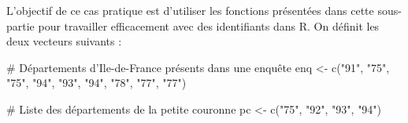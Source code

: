 \documentclass[12pt,twosided, notitlepage]{book}
\newenvironment{Shaded}{}{}
\newcommand{\KeywordTok}[1]{\textcolor[rgb]{0.00,0.00,1.00}{#1}}
\newcommand{\StringTok}[1]{\textcolor[rgb]{0.00,0.50,0.50}{#1}}
\newcommand{\CommentTok}[1]{\textcolor[rgb]{0.00,0.50,0.00}{#1}}
\newcommand{\NormalTok}[1]{#1}
\renewenvironment{Shaded}{\begin{snugshade}}{\end{snugshade}}
\begin{document}
L'objectif de ce cas pratique est d'utiliser les fonctions présentées
dans cette sous-partie pour travailler efficacement avec des
identifiants dans R. On définit les deux vecteurs suivants :

\begin{Shaded}
\begin{Highlighting}[]
\CommentTok{# Départements d'Ile-de-France présents dans une enquête}
\NormalTok{enq <-}\StringTok{ }\KeywordTok{c}\NormalTok{(}\StringTok{"91"}\NormalTok{, }\StringTok{"75"}\NormalTok{, }\StringTok{"75"}\NormalTok{, }\StringTok{"94"}\NormalTok{, }\StringTok{"93"}\NormalTok{, }\StringTok{"94"}\NormalTok{, }\StringTok{"78"}\NormalTok{, }\StringTok{"77"}\NormalTok{, }\StringTok{"77"}\NormalTok{)}

\CommentTok{# Liste des départements de la petite couronne}
\NormalTok{pc <-}\StringTok{ }\KeywordTok{c}\NormalTok{(}\StringTok{"75"}\NormalTok{, }\StringTok{"92"}\NormalTok{, }\StringTok{"93"}\NormalTok{, }\StringTok{"94"}\NormalTok{)}
\end{Highlighting}
\end{Shaded}
\end{document}
